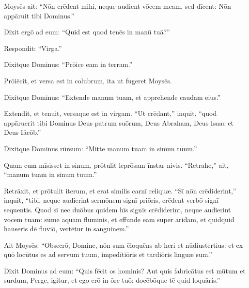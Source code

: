 
\thispagestyle{empty}

\vspace*{-1.0cm}

 Moysēs ait: ``Nōn crēdent mihi, neque audient vōcem meam, sed dīcent:
Nōn appāruit tibi Dominus.''

Dīxit ergō ad eum: ``Quid est quod tenēs in manū tuā?''

Respondit: ``Virga.''

Dīxitque Dominus: ``Prōice eam in terram.''

Prōiēcit, et versa est in colubrum, ita ut fugeret Moysēs. 

Dīxitque Dominus: ``Extende manum tu\-am, et apprehende caudam eius.''

Extendit, et tenuit, versaque est in virgam.
``Ut crēdant,'' inquit, ``quod appāruerit tibi Dominus Deus patrum suōrum,
Deus Abraham, Deus Isaac et Deus Iācōb.''

Dīxitque Dominus rūrsum: ``Mitte manum tuam in sinum tuum.''

Quam cum mīsisset in sinum, prōtulit leprōsam īnstar nivis.
``Retrahe,'' ait, ``manum tuam in sinum tuum.''

Retrāxit, et prōtulit iterum,
et erat similis carnī reliquæ.
``Sī nōn crēdiderint,'' inquit, ``tibi, neque audierint
sermōnem signī priōris, crēdent verbō signī sequentis. 
Quod sī nec duōbus quidem hīs signīs crēdiderint,
neque audierint vōcem tuam: sūme aquam flūminis,
et effunde eam super āridam, et quidquid hauserīs dē fluviō,
vertētur in sanguinem.''


Ait Moysēs: ``Obsecrō, Domine, nōn sum ēloquēns ab heri et
nūdiustertius: et ex quō locūtus es ad servum tuum,
impedītiōris et tardiōris linguæ sum.''

Dīxit Dominus ad eum: ``Quis fēcit os hominis?
Aut quis fabricātus est mūtum et surdum,
Perge, igitur, et ego erō in ōre tuō:
docēbōque tē quid loquāris.''

